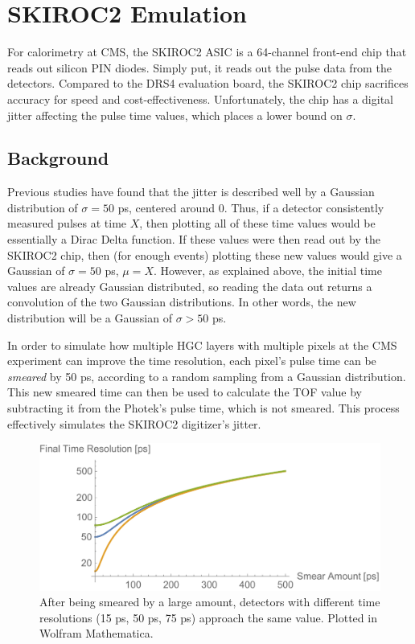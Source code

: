 \documentclass[twocolumn,aps,prd,reprint,superscriptaddress,floatfix]{revtex4-1}
\begin{document}
\section{SKIROC2 Emulation}
For calorimetry at CMS, the SKIROC2 ASIC is a 64-channel front-end chip that reads out silicon PIN diodes.
Simply put, it reads out the pulse data from the detectors.
Compared to the DRS4 evaluation board, the SKIROC2 chip sacrifices accuracy for speed and cost-effectiveness.
Unfortunately, the chip has a digital jitter affecting the pulse time values, which places a lower bound on $\sigma$. 

\subsection{Background}
Previous studies have found that the jitter is described well by a Gaussian distribution of $\sigma=50$ ps, centered around 0.
Thus, if a detector consistently measured pulses at time $X$, then plotting all of these time values would be essentially a Dirac Delta function.
If these values were then read out by the SKIROC2 chip, then (for enough events) plotting these new values would give a Gaussian of $\sigma = 50$ ps, $\mu = X$.
However, as explained above, the initial time values are already Gaussian distributed, so reading the data out returns a convolution of the two Gaussian distributions. 
In other words, the new distribution will be a Gaussian of $\sigma > 50$ ps.

In order to simulate how multiple HGC layers with multiple pixels at the CMS experiment can improve the time resolution, each pixel's pulse time can be \textit{smeared} by 50 ps, according to a random sampling from a Gaussian distribution.
This new smeared time can then be used to calculate the TOF value by subtracting it from the Photek's pulse time, which is not smeared.
This process effectively simulates the SKIROC2 digitizer's jitter.

\begin{figure}[!htbp]
	\centering
	\includegraphics[width=\linewidth]{mathematica_plot.pdf}
	\caption{After being smeared by a large amount, detectors with different time resolutions (15 ps, 50 ps, 75 ps) approach the same value. Plotted in Wolfram Mathematica.}
	\label{fig:mathematica_plot}
\end{figure}
\end{document}
